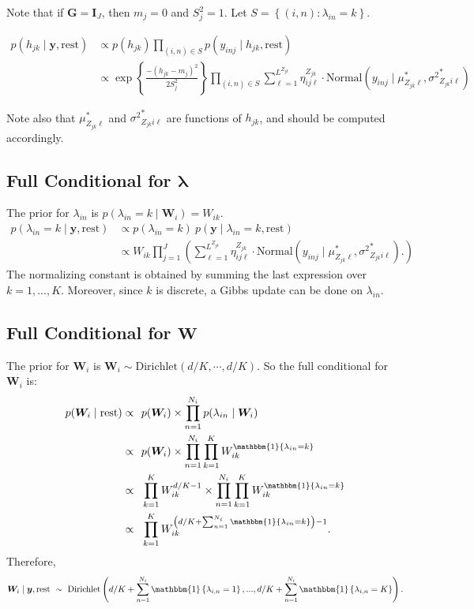 \documentclass[12pt]{article}
\newcommand{\p}[1]{\left(#1\right)}
\newcommand{\bc}[1]{ \left\{#1\right\} }
\newcommand{\N}{ \mathcal{N} }
\newcommand{\I}{\mathrm{\mathbf{I}}}
\def\N{\text{Normal}}
\def\Dir{\text{Dirichlet}}
\def\lin{\lambda_{in}}
\def\y{\bm{y}}
\def\mus{\mu^*}
\def\sss{{\sigma^2}^*}
\newcommand{\Ind}[1]{\mathbbm{1}\bc{#1}}
\def\rest{\text{rest}}
\begin{document}
Note that if $\bm G = \I_J$, then $m_j=0$ and $S_j^2 = 1$. Let
$S = \bc{(i,n)\colon \lin=k}$.

\begin{align*}
p(h_{jk} \mid \y, \rest)  &\propto p(h_{jk}) \prod_{(i,n) \in S} p(y_{inj} \mid h_{jk}, \rest) \\
%
&\propto
\exp\bc{\frac{-(h_{jk} - m_j)^2}{2S_j^2}}
\prod_{(i,n)\in S}
\sum_{\ell=1}^{L^{Z_{jk}}} \eta^{Z_{jk}}_{ij\ell} \cdot
\N(y_{inj} \mid \mus_{Z_{jk}\ell}, \sss_{Z_{jk}i\ell})
\end{align*}


Note also that $\mus_{Z_{jk}\ell}$ and $\sss_{Z_{jk}i\ell}$ are
functions of $h_{jk}$, and should be computed accordingly.

\subsection{\texorpdfstring{Full Conditional for
$\bm \lambda$}{Full Conditional for \textbackslash{}bm \textbackslash{}lambda}}\label{full-conditional-for-bm-lambda}

The prior for $\lin$ is $p(\lin = k \mid \bm W_i) = W_{ik}$.
%
\begin{align*}
p(\lin=k\mid \y,\rest) &\propto p(\lin=k) ~ p(\y \mid \lin=k, \rest) \\
&\propto W_{ik}
\prod_{j=1}^J 
\p{
  \sum_{\ell=1}^{L^{Z_{jk}}} \eta^{Z_{jk}}_{ij\ell} \cdot
  \N(y_{inj} \mid 
  \mus_{Z_{jk}\ell}, \sss_{Z_{jk}i\ell}).
}
\end{align*}
%
The normalizing constant is obtained by summing the last expression over
$k = 1,...,K$. Moreover, since $k$ is discrete, a Gibbs update can
be done on $\lin$.

\subsection{\texorpdfstring{Full Conditional for
$\bm W$}{Full Conditional for \textbackslash{}bm W}}\label{full-conditional-for-bm-w}

The prior for $\bm{W}_i$ is $\bm W_i \sim \Dir(d/K, \cdots, d/K)$. So
the full conditional for $\bm{W}_i$ is:
%
\begin{align*}
p(\bm W_i \mid \rest) \propto&~~ p(\bm{W}_i) \times \prod_{n=1}^{N_i} p(\lin \mid \bm{W}_i)\\
\propto&~~ p(\bm{W}_i) \times \prod_{n=1}^{N_i}\prod_{k=1}^K W_{ik}^{\Ind{\lin=k}}\\
\propto&~~ \prod_{k=1}^K W_{ik}^{d/K-1} \times \prod_{n=1}^{N_i}\prod_{k=1}^K W_{ik}^{\Ind{\lin=k}}\\
\propto&~~ \prod_{k=1}^K W_{ik}^{\p{d/K + \sum_{n=1}^{N_i}\Ind{\lin=k}}-1}.
%
\end{align*}
%
Therefore, $$
\bm{W}_i \mid \y,\rest ~\sim~ \Dir\p{d/K+\sum_{n=1}^{N_i}\Ind{\lambda_{i,n}=1},...,d/K+\sum_{n=1}^{N_i}\Ind{\lambda_{i,n}=K}}. 
$$
\end{document}
